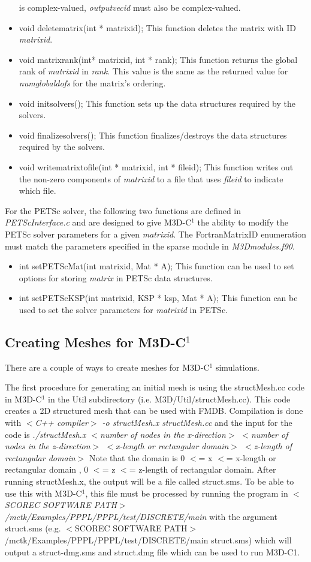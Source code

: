 \begin{itemize}
is complex-valued, \textit{outputvecid} must also be complex-valued.
\item  void deletematrix(int * matrixid);  This function deletes the matrix with ID \textit{matrixid}.
\item  void matrixrank(int* matrixid, int * rank);  This function returns the global rank of \textit{matrixid}
in \textit{rank}.  This value is the same as the returned value for \textit{numglobaldofs} for the matrix's
ordering.
\item  void initsolvers();  This function sets up the data structures required by the solvers.
\item  void finalizesolvers();  This function finalizes/destroys the data structures required by the solvers.
\item  void writematrixtofile(int * matrixid, int * fileid);  This function writes out the non-zero components
of \textit{matrixid} to a file that uses \textit{fileid} to indicate which file.
\end{itemize}
For the PETSc solver, the following two functions are defined in \textit{PETScInterface.c} and are designed
to give M3D-C$^1$ the ability to modify the PETSc solver parameters for a given \textit{matrixid}.  
The FortranMatrixID enumeration must match the parameters specified in the sparse module in \textit{M3Dmodules.f90}.
\begin{itemize}
\item  int setPETScMat(int matrixid, Mat * A);  This function can be used to set options for storing \textit{matrix}
in PETSc data structures.
\item int setPETScKSP(int matrixid, KSP * ksp, Mat * A); This function can be used to set the solver
parameters for \textit{matrixid} in PETSc.
\end{itemize}

\subsection{Creating Meshes for M3D-C$^1$}
There are a couple of ways to create meshes for M3D-C$^1$ simulations.  

The first procedure for generating an initial mesh is using the 
structMesh.cc code in 
M3D-C$^1$ in the Util subdirectory (i.e. M3D/Util/structMesh.cc).  This code
 creates a 2D structured mesh that can be used with FMDB.  Compilation is done with
 \textit{$<$C++ compiler$>$ -o structMesh.x structMesh.cc} and the input for the code is
\textit{./structMesh.x $<$number of nodes in the x-direction$>$ $<$number of nodes in the z-direction$>$ 
$<$x-length or rectangular domain$>$ $<$z-length of rectangular domain$>$}
Note that the domain is 0 $<$= x $<$= x-length or rectangular domain , 0 $<$= z $<$= z-length of rectangular domain.
After running structMesh.x, the output will be a file called struct.sms.  To be
able to use this with M3D-C$^1$, this file must be processed by running the program
in \textit{$<$SCOREC SOFTWARE PATH$>$/mctk/Examples/PPPL/PPPL/test/DISCRETE/main} with the argument struct.sms 
(e.g. $<$SCOREC SOFTWARE PATH$>$/mctk/Examples/PPPL/PPPL/test/DISCRETE/main struct.sms)
which will output a struct-dmg.sms and struct.dmg file which can be used to
run M3D-C1.

